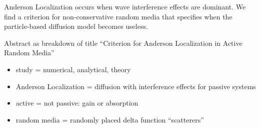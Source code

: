 Anderson Localization occurs when wave interference effects are dominant. We find a criterion for non-conservative random media that specifies when the particle-based diffusion model becomes useless.


Abstract as breakdown of title ``Criterion for Anderson Localization in Active Random Media''
\begin{itemize}
\item study = numerical, analytical, theory
\item Anderson Localization = diffusion with interference effects for passive systems
\item active = not passive: gain or absorption
\item random media = randomly placed delta function ``scatterers'' 
\end{itemize}